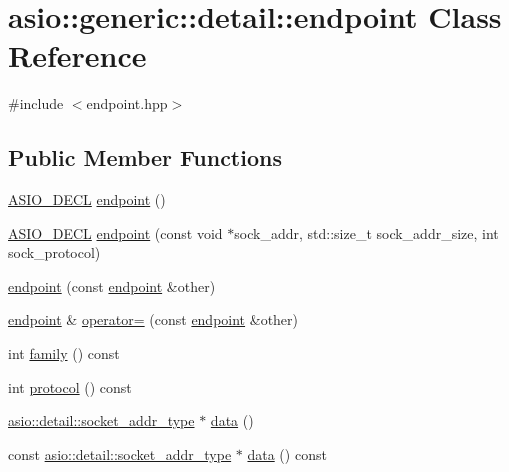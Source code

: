 \hypertarget{classasio_1_1generic_1_1detail_1_1endpoint}{}\section{asio\+:\+:generic\+:\+:detail\+:\+:endpoint Class Reference}
\label{classasio_1_1generic_1_1detail_1_1endpoint}


{\ttfamily \#include $<$endpoint.\+hpp$>$}

\subsection*{Public Member Functions}
\begin{DoxyCompactItemize}
\item 
\hyperlink{config_8hpp_ab54d01ea04afeb9a8b39cfac467656b7}{A\+S\+I\+O\+\_\+\+D\+E\+C\+L} \hyperlink{classasio_1_1generic_1_1detail_1_1endpoint_ac9e985f6a6d064dd86cfb3555dee811f}{endpoint} ()
\item 
\hyperlink{config_8hpp_ab54d01ea04afeb9a8b39cfac467656b7}{A\+S\+I\+O\+\_\+\+D\+E\+C\+L} \hyperlink{classasio_1_1generic_1_1detail_1_1endpoint_aad96c406d63269810534acb15c3d12ca}{endpoint} (const void $\ast$sock\+\_\+addr, std\+::size\+\_\+t sock\+\_\+addr\+\_\+size, int sock\+\_\+protocol)
\item 
\hyperlink{classasio_1_1generic_1_1detail_1_1endpoint_a405e315b9d34174c7f386c441bd003f4}{endpoint} (const \hyperlink{classasio_1_1generic_1_1detail_1_1endpoint}{endpoint} \&other)
\item 
\hyperlink{classasio_1_1generic_1_1detail_1_1endpoint}{endpoint} \& \hyperlink{classasio_1_1generic_1_1detail_1_1endpoint_a9ac9a114732c7da860e4207603de6153}{operator=} (const \hyperlink{classasio_1_1generic_1_1detail_1_1endpoint}{endpoint} \&other)
\item 
int \hyperlink{classasio_1_1generic_1_1detail_1_1endpoint_a02c33007176dc7b5707a604869d1b0de}{family} () const 
\item 
int \hyperlink{classasio_1_1generic_1_1detail_1_1endpoint_a34f191b801aad6293f1bbecaceb7026f}{protocol} () const 
\item 
\hyperlink{namespaceasio_1_1detail_a40a7b0385a38f87815ffbb8df5e34d05}{asio\+::detail\+::socket\+\_\+addr\+\_\+type} $\ast$ \hyperlink{classasio_1_1generic_1_1detail_1_1endpoint_a59187291b7f985db438de54284dbbf72}{data} ()
\item 
const \hyperlink{namespaceasio_1_1detail_a40a7b0385a38f87815ffbb8df5e34d05}{asio\+::detail\+::socket\+\_\+addr\+\_\+type} $\ast$ \hyperlink{classasio_1_1generic_1_1detail_1_1endpoint_aeb7c32d27b2c770d3452691276dc648e}{data} () const 

\end{DoxyCompactItemize}
